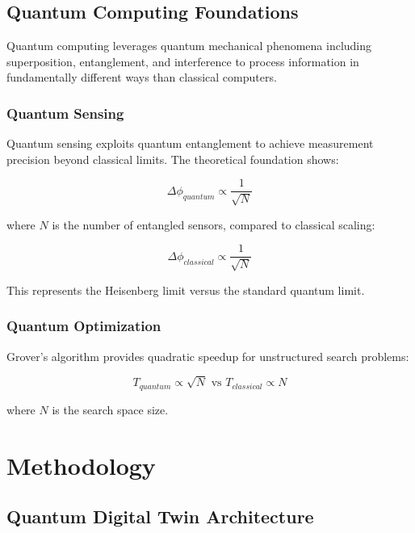 \documentclass[12pt,a4paper]{report}
\begin{document}
\section{Quantum Computing Foundations}

Quantum computing leverages quantum mechanical phenomena including superposition, entanglement, and interference to process information in fundamentally different ways than classical computers.

\subsection{Quantum Sensing}

Quantum sensing exploits quantum entanglement to achieve measurement precision beyond classical limits. The theoretical foundation shows:

\begin{equation}
\Delta\phi_{quantum} \propto \frac{1}{\sqrt{N}}
\end{equation}

where $N$ is the number of entangled sensors, compared to classical scaling:

\begin{equation}
\Delta\phi_{classical} \propto \frac{1}{\sqrt{N}}
\end{equation}

This represents the Heisenberg limit versus the standard quantum limit.

\subsection{Quantum Optimization}

Grover's algorithm provides quadratic speedup for unstructured search problems:

\begin{equation}
T_{quantum} \propto \sqrt{N} \text{ vs } T_{classical} \propto N
\end{equation}

where $N$ is the search space size.

\chapter{Methodology}

\section{Quantum Digital Twin Architecture}
\end{document}
